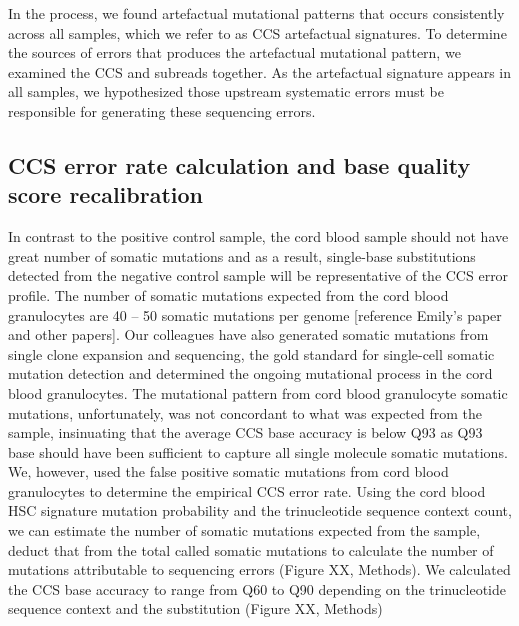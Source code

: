 In the process, we found artefactual mutational patterns that occurs consistently across all samples, which we refer to as CCS artefactual signatures. To determine the sources of errors that produces the artefactual mutational pattern, we examined the CCS and subreads together. As the artefactual signature appears in all samples, we hypothesized those upstream systematic errors must be responsible for generating these sequencing errors. 

\subsection{CCS error rate calculation and base quality score recalibration}

In contrast to the positive control sample, the cord blood sample should not have great number of somatic mutations and as a result, single-base substitutions detected from the negative control sample will be representative of the CCS error profile. The number of somatic mutations expected from the cord blood granulocytes are 40 – 50 somatic mutations per genome [reference Emily’s paper and other papers]. Our colleagues have also generated somatic mutations from single clone expansion and sequencing, the gold standard for single-cell somatic mutation detection and determined the ongoing mutational process in the cord blood granulocytes. The mutational pattern from cord blood granulocyte somatic mutations, unfortunately, was not concordant to what was expected from the sample, insinuating that the average CCS base accuracy is below Q93 as Q93 base should have been sufficient to capture all single molecule somatic mutations. We, however, used the false positive somatic mutations from cord blood granulocytes to determine the empirical CCS error rate. Using the cord blood HSC signature mutation probability and the trinucleotide sequence context count, we can estimate the number of somatic mutations expected from the sample, deduct that from the total called somatic mutations to calculate the number of mutations attributable to sequencing errors (Figure XX, Methods). We calculated the CCS base accuracy to range from Q60 to Q90 depending on the trinucleotide sequence context and the substitution (Figure XX, Methods)

